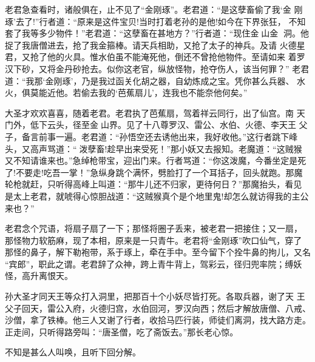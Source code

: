 老君急查看时，诸般俱在，止不见了“金刚琢”。老君道：“是这孽畜偷了我‘金
刚琢’去了!”行者道：“原来是这件宝贝!当时打着老孙的是他!如今在下界张狂，
不知套了我等多少物件！”老君道：“这孽畜在甚地方？”行者道：“现住金山金
洞。他捉了我唐僧进去，抢了我金箍棒。请天兵相助，又抢了太子的神兵。及请
火德星君，又抢了他的火具。惟水伯虽不能淹死他，倒还不曾抢他物件。至请如来
着罗汉下砂，又将金丹砂抢去。似你这老官，纵放怪物，抢夺伤人，该当何罪？”
老君道：“我那‘金刚琢’，乃是我过函关化胡之器，自幼炼成之宝。凭你甚么兵器、
水火，俱莫能近他。若偷去我的‘芭蕉扇儿’，连我也不能奈他何矣。”

大圣才欢欢喜喜，随着老君。老君执了芭蕉扇，驾着祥云同行，出了仙宫。南
天门外，低下云头，径至金山界。见了十八尊罗汉、雷公、水伯、火德、李天王
父子，备言前事一遍。老君道：“孙悟空还去诱他出来，我好收他。”这行者跳下峰
头，又高声骂道：“泼孽畜!趁早出来受死！”那小妖又去报知。老魔道：“这贼猴
又不知请谁来也。”急绰枪带宝，迎出门来。行者骂道：“你这泼魔，今番坐定是死
了!不要走!吃吾一掌！”急纵身跳个满怀，劈脸打了一个耳括子，回头就跑。那魔
轮枪就赶，只听得高峰上叫道：“那牛儿还不归家，更待何日？”那魔抬头，看见
是太上老君，就唬得心惊胆战道：“这贼猴真个是个地里鬼!却怎么就访得我的主公
来也？”

老君念个咒语，将扇子扇了一下；那怪将圈子丢来，被老君一把接住；又一扇，
那怪物力软筋麻，现了本相，原来是一只青牛。老君将“金刚琢”吹口仙气，穿了
那怪的鼻子，解下勒袍带，系于琢上，牵在手中。至今留下个拴牛鼻的拘儿，又名
“宾郎”，职此之谓。老君辞了众神，跨上青牛背上，驾彩云，径归兜率院；缚妖
怪，高升离恨天。

孙大圣才同天王等众打入洞里，把那百十个小妖尽皆打死。各取兵器，谢了天
王父子回天，雷公入府，火德归宫，水伯回河，罗汉向西；然后才解放唐僧、八戒、
沙僧，拿了铁棒。他三人又谢了行者，收拾马匹行装，师徒们离洞，找大路方走。
正走间，只听得路旁叫：“唐圣僧，吃了斋饭去。”那长老心惊。

不知是甚么人叫唤，且听下回分解。
